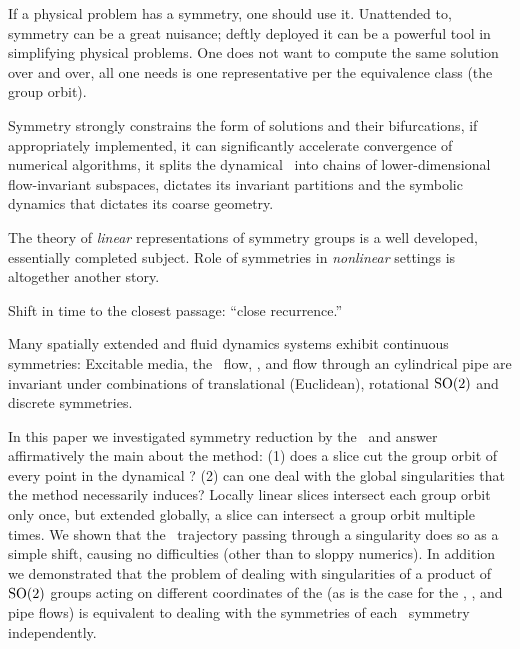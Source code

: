 

If a physical problem has a symmetry, one should use it.
Unattended to, symmetry can be a great nuisance; deftly deployed
it can be a powerful tool in simplifying physical problems.
One does not want to compute the same solution over and over, all
one needs is one representative per the equivalence class (the group orbit).

Symmetry strongly constrains the form of solutions and their bifurcations,
if appropriately implemented, it can significantly accelerate
convergence of numerical algorithms,
it splits the dynamical \statesp\ into chains of lower-dimensional flow-invariant
subspaces, dictates its invariant partitions and the symbolic dynamics that dictates its coarse geometry.

The theory of \emph{linear} representations of symmetry groups is
a well developed, essentially completed subject. Role of symmetries in
\emph{nonlinear} settings is altogether another story.

Shift in time to the closest passage: ``close recurrence.''

Many spatially extended and fluid dynamics systems exhibit continuous symmetries:
Excitable media,
the \KS\ flow,
{\pCf}, and flow through an
cylindrical pipe are invariant under
combinations of translational (Euclidean), rotational
$\textrm{SO}(2)$ and discrete symmetries.

In this paper we investigated symmetry reduction by the
\mslices\ and answer affirmatively the main about the method:
(1) does a slice cut the group orbit of every point in the dynamical \statesp?
(2) can one deal with the global singularities that the method necessarily
induces? Locally linear slices intersect each group orbit only once,
but extended globally, a slice can intersect a group orbit multiple times.
We shown that the \reducedsp\ trajectory
passing through a singularity does so as a simple shift,
causing no difficulties (other than to sloppy numerics). In addition we
demonstrated that the problem of dealing with singularities of a product
of $\textrm{SO}(2)$ groups acting on different coordinates of the {\statesp}
(as is the case for the \KS{},
{\pCf}, and
pipe flows) is equivalent to dealing with the
symmetries of each \ symmetry independently.



